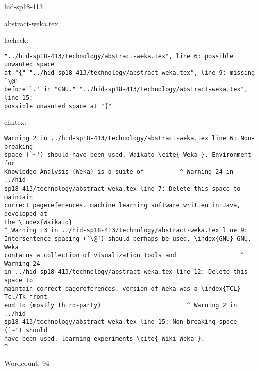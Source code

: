 \begin{IU}

hid-sp18-413

\href{https://github.com/cloudmesh-community/hid-sp18-413/blob/master//technology/abstract-weka.tex}{abstract-weka.tex}

 
lacheck:
\begin{tiny}
\begin{verbatim}
"../hid-sp18-413/technology/abstract-weka.tex", line 6: possible unwanted space
at "{" "../hid-sp18-413/technology/abstract-weka.tex", line 9: missing `\@'
before `.' in "GNU." "../hid-sp18-413/technology/abstract-weka.tex", line 15:
possible unwanted space at "{"
\end{verbatim}
\end{tiny}
chktex:
\begin{tiny}
\begin{verbatim}
Warning 2 in ../hid-sp18-413/technology/abstract-weka.tex line 6: Non-breaking
space (`~') should have been used. Waikato \cite{ Weka }. Environment for
Knowledge Analysis (Weka) is a suite of          ^ Warning 24 in ../hid-
sp18-413/technology/abstract-weka.tex line 7: Delete this space to maintain
correct pagereferences. machine learning software written in Java, developed at
the \index{Waikato}
^ Warning 13 in ../hid-sp18-413/technology/abstract-weka.tex line 9:
Intersentence spacing (`\@') should perhaps be used. \index{GNU} GNU. Weka
contains a collection of visualization tools and                  ^ Warning 24
in ../hid-sp18-413/technology/abstract-weka.tex line 12: Delete this space to
maintain correct pagereferences. version of Weka was a \index{TCL} Tcl/Tk front-
end to (mostly third-party)                        ^ Warning 2 in ../hid-
sp18-413/technology/abstract-weka.tex line 15: Non-breaking space (`~') should
have been used. learning experiments \cite{ Wiki-Weka }.                       ^
\end{verbatim}
\end{tiny}

Wordcount: 94

\end{IU}



